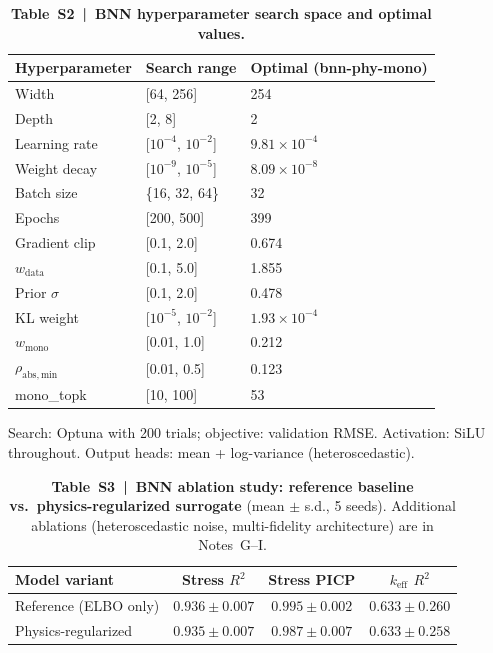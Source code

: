 \documentclass[11pt,a4paper]{article}
\newcommand{\keff}{\ensuremath{k_{\mathrm{eff}}}}
\begin{document}
\begin{table}[htbp]
\centering
\caption{\textbf{Table~S2~|~BNN hyperparameter search space and optimal
values.}}
\label{tab:S2}
\smallskip
\small
\begin{tabular}{lll}
\toprule
Hyperparameter & Search range & Optimal (bnn-phy-mono) \\
\midrule
Width           & [64, 256]           & 254 \\
Depth           & [2, 8]              & 2 \\
Learning rate   & [$10^{-4}$, $10^{-2}$] & $9.81\times10^{-4}$ \\
Weight decay    & [$10^{-9}$, $10^{-5}$] & $8.09\times10^{-8}$ \\
Batch size      & \{16, 32, 64\}      & 32 \\
Epochs          & [200, 500]          & 399 \\
Gradient clip   & [0.1, 2.0]          & 0.674 \\
$w_\mathrm{data}$ & [0.1, 5.0]       & 1.855 \\
Prior $\sigma$  & [0.1, 2.0]          & 0.478 \\
KL weight       & [$10^{-5}$, $10^{-2}$] & $1.93\times10^{-4}$ \\
$w_\mathrm{mono}$ & [0.01, 1.0]      & 0.212 \\
$\rho_\mathrm{abs,min}$ & [0.01, 0.5] & 0.123 \\
mono\_topk      & [10, 100]           & 53 \\
\bottomrule
\end{tabular}

\smallskip
Search: Optuna with 200 trials; objective: validation RMSE.
Activation: SiLU throughout. Output heads: mean + log-variance
(heteroscedastic).
\end{table}

\begin{table}[htbp]
\centering
\caption{\textbf{Table~S3~|~BNN ablation study: reference baseline vs.\
physics-regularized surrogate} (mean $\pm$ s.d., 5 seeds).
Additional ablations (heteroscedastic noise, multi-fidelity architecture)
are in Notes~G--I.}
\label{tab:S3}
\smallskip
\small
\begin{tabular}{lccc}
\toprule
Model variant & Stress $R^2$ & Stress PICP & \keff{} $R^2$ \\
\midrule
Reference (ELBO only) & $0.936\pm0.007$ & $0.995\pm0.002$ & $0.633\pm0.260$ \\
Physics-regularized   & $0.935\pm0.007$ & $0.987\pm0.007$ & $0.633\pm0.258$ \\
\bottomrule
\end{tabular}
\end{table}
\end{document}
